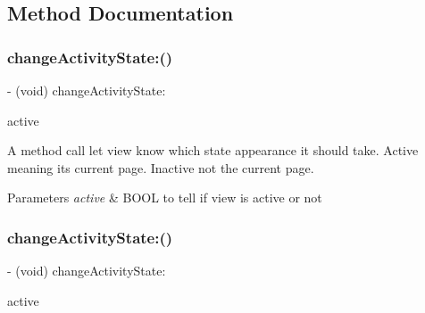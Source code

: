 \subsection{Method Documentation}
\mbox{\label{interface_t_a_abstract_dot_view_a980afa16977f7956129faeb494dfc760}} 
\subsubsection{\texorpdfstring{change\+Activity\+State\+:()}{changeActivityState:()}\hspace{0.1cm}{\footnotesize\ttfamily [1/3]}}
{\footnotesize\ttfamily -\/ (void) change\+Activity\+State\+: \begin{DoxyParamCaption}\item[{(B\+O\+OL)}]{active }\end{DoxyParamCaption}}

A method call let view know which state appearance it should take. Active meaning it\textquotesingle{}s current page. Inactive not the current page.


\begin{DoxyParams}{Parameters}
{\em active} & B\+O\+OL to tell if view is active or not \\
\hline
\end{DoxyParams}
\mbox{\label{interface_t_a_abstract_dot_view_a980afa16977f7956129faeb494dfc760}} 
\subsubsection{\texorpdfstring{change\+Activity\+State\+:()}{changeActivityState:()}\hspace{0.1cm}{\footnotesize\ttfamily [2/3]}}
{\footnotesize\ttfamily -\/ (void) change\+Activity\+State\+: \begin{DoxyParamCaption}\item[{(B\+O\+OL)}]{active }\end{DoxyParamCaption}}

